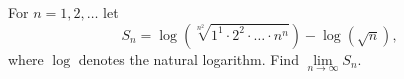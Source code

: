 \documentclass{article}
\begin{document}
\setlength{\parindent}{0pt}
For $n=1,2,\ldots$ let$$S_n = \log\left( \sqrt[n^2]{1^1\cdot 2^2\cdot\ldots\cdot n^n}\right) - \log (\sqrt{n}),$$where $\log$ denotes the natural logarithm. Find $\mathop{\lim}\limits_{n\to\infty} S_n$.
\end{document}
